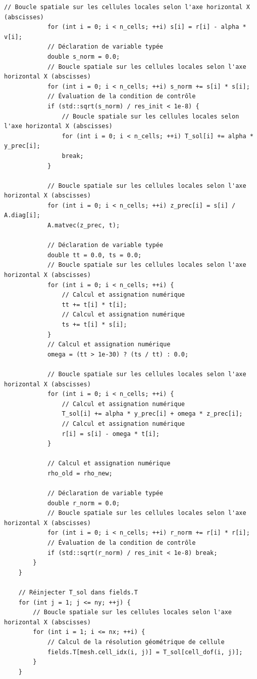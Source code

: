 \documentclass[10pt,a4paper,oneside]{book}
\begin{document}
\begin{lstlisting}[language={[11]C++}]
            // Boucle spatiale sur les cellules locales selon l'axe horizontal X (abscisses)
            for (int i = 0; i < n_cells; ++i) s[i] = r[i] - alpha * v[i];
            // Déclaration de variable typée
            double s_norm = 0.0;
            // Boucle spatiale sur les cellules locales selon l'axe horizontal X (abscisses)
            for (int i = 0; i < n_cells; ++i) s_norm += s[i] * s[i];
            // Évaluation de la condition de contrôle
            if (std::sqrt(s_norm) / res_init < 1e-8) {
                // Boucle spatiale sur les cellules locales selon l'axe horizontal X (abscisses)
                for (int i = 0; i < n_cells; ++i) T_sol[i] += alpha * y_prec[i];
                break;
            }

            // Boucle spatiale sur les cellules locales selon l'axe horizontal X (abscisses)
            for (int i = 0; i < n_cells; ++i) z_prec[i] = s[i] / A.diag[i];
            A.matvec(z_prec, t);

            // Déclaration de variable typée
            double tt = 0.0, ts = 0.0;
            // Boucle spatiale sur les cellules locales selon l'axe horizontal X (abscisses)
            for (int i = 0; i < n_cells; ++i) {
                // Calcul et assignation numérique
                tt += t[i] * t[i];
                // Calcul et assignation numérique
                ts += t[i] * s[i];
            }
            // Calcul et assignation numérique
            omega = (tt > 1e-30) ? (ts / tt) : 0.0;

            // Boucle spatiale sur les cellules locales selon l'axe horizontal X (abscisses)
            for (int i = 0; i < n_cells; ++i) {
                // Calcul et assignation numérique
                T_sol[i] += alpha * y_prec[i] + omega * z_prec[i];
                // Calcul et assignation numérique
                r[i] = s[i] - omega * t[i];
            }

            // Calcul et assignation numérique
            rho_old = rho_new;

            // Déclaration de variable typée
            double r_norm = 0.0;
            // Boucle spatiale sur les cellules locales selon l'axe horizontal X (abscisses)
            for (int i = 0; i < n_cells; ++i) r_norm += r[i] * r[i];
            // Évaluation de la condition de contrôle
            if (std::sqrt(r_norm) / res_init < 1e-8) break;
        }
    }

    // Réinjecter T_sol dans fields.T
    for (int j = 1; j <= ny; ++j) {
        // Boucle spatiale sur les cellules locales selon l'axe horizontal X (abscisses)
        for (int i = 1; i <= nx; ++i) {
            // Calcul de la résolution géométrique de cellule
            fields.T[mesh.cell_idx(i, j)] = T_sol[cell_dof(i, j)];
        }
    }


\end{lstlisting}
\end{document}
